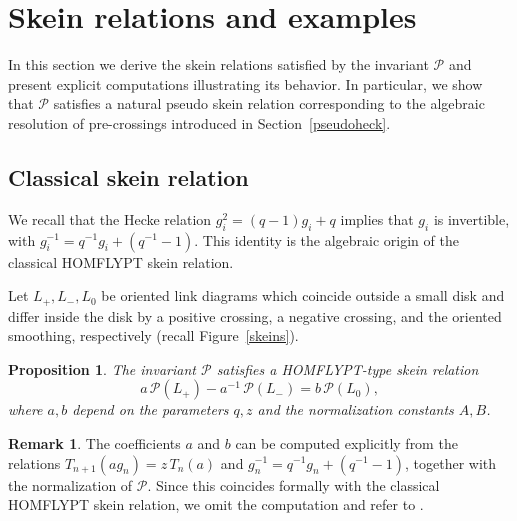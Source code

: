 \documentclass[11pt]{article}
\numberwithin{equation}{section}
\newtheorem{proposition}[theorem]{Proposition}
\theoremstyle{definition}
\newtheorem{remark}[theorem]{Remark}
\begin{document}

\section{Skein relations and examples}\label{skein}

In this section we derive the skein relations satisfied by the invariant \(\mathcal P\) and present explicit computations illustrating its behavior. In particular, we show that \(\mathcal P\) satisfies a natural pseudo skein relation corresponding to the algebraic resolution of pre-crossings introduced in Section~\ref{pseudoheck}.



\subsection{Classical skein relation}

We recall that the Hecke relation \(g_i^2 = (q-1)g_i + q\) implies that \(g_i\) is invertible, with \(g_i^{-1} = q^{-1} g_i + (q^{-1}-1)\). This identity is the algebraic origin of the classical HOMFLYPT skein relation.

\medskip

Let \(L_+, L_-, L_0\) be oriented link diagrams which coincide outside a small disk and differ inside the disk by a positive crossing, a negative crossing, and the oriented smoothing, respectively (recall Figure~\ref{skeins}).



\begin{proposition}
The invariant \(\mathcal P\) satisfies a HOMFLYPT-type skein relation
\[
a\,\mathcal P(L_+) - a^{-1}\,\mathcal P(L_-)
=
b\,\mathcal P(L_0),
\]
where \(a,b\) depend on the parameters \(q,z\) and the normalization constants \(A,B\).
\end{proposition}

\begin{remark}
The coefficients \(a\) and \(b\) can be computed explicitly from the relations \(T_{n+1}(a g_n)=z\,T_n(a)\) and \(g_n^{-1}=q^{-1}g_n+(q^{-1}-1)\), together with the normalization of \(\mathcal P\). Since this coincides formally with the classical HOMFLYPT skein relation, we omit the computation and refer to \cite{Jones1987, HOMFLY1985}.
\end{remark}

\end{document}
